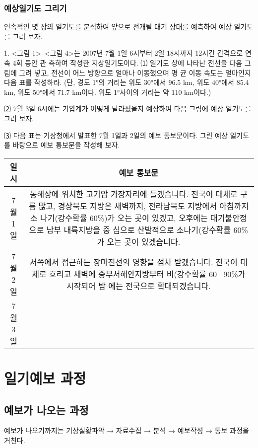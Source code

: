 \begin{corollary}
\subsection{예상일기도 그리기}

연속적인 몇 장의 일기도를 분석하여 앞으로 전개될 대기 상태를 예측하여 예상 일기도를 그려 보자.

1. <그림 1>~<그림 4>는 2007년 7월 1일 6시부터 2일 18시까지 12시간 간격으로 연속 4회 동안 관
측하여 작성한 지상일기도이다.
⑴ 일기도 상에 나타난 전선을 다음 그림에 그려 넣고, 전선이 어느 방향으로 얼마나 이동했으며 평
균 이동 속도는 얼마인지 다음 표를 작성하라. (단, 경도 1°의 거리는 위도 30°에서 96.5 km, 위도
40°에서 85.4 km, 위도 50°에서 71.7 km이다. 위도 1°사이의 거리는 약 110 km이다.)


⑵ 7월 3일 6시에는 기압계가 어떻게 달라졌을지 예상하여 다음 그림에 예상 일기도를 그려 보자.

⑶ 다음 표는  기상청에서 발표한 7월 1일과 2일의 예보 통보문이다. 그린 예상 일기도를 바탕으로 예보 통보문을 작성해 보자.

\begin{tabular}{|c|c|}
	\hline 
일시	& 예보 통보문 \\ 
	\hline 
	7월 1일	& 동해상에 위치한 고기압 가장자리에 들겠습니다.
	전국이 대체로 구름 많고, 경상북도 지방은 새벽까지, 전라남북도 지방에서 아침까지 소
	나기(강수확률 60{\%})가 오는 곳이 있겠고, 오후에는 대기불안정으로 남부 내륙지방을 중
	심으로 산발적으로 소나기(강수확률 60{\%}가 오는 곳이 있겠습니다. \\ 
	\hline 
	7월 2일	& 서쪽에서 접근하는 장마전선의 영향을 점차 받겠습니다.
	전국이 대체로 흐리고 새벽에 중부서해안지방부터 비(강수확률 60~ 90{\%}가 시작되어 밤
	에는 전국으로 확대되겠습니다. \\ 
	\hline 
	7월 3일	&  \\ 
	\hline 
\end{tabular} 



\chapter{일기예보 과정}

\section{예보가 나오는 과정}

예보가 나오기까지는 기상실황파악 → 자료수집 → 분석 → 예보작성 → 통보 과정을 거친다. 


\end{corollary}
